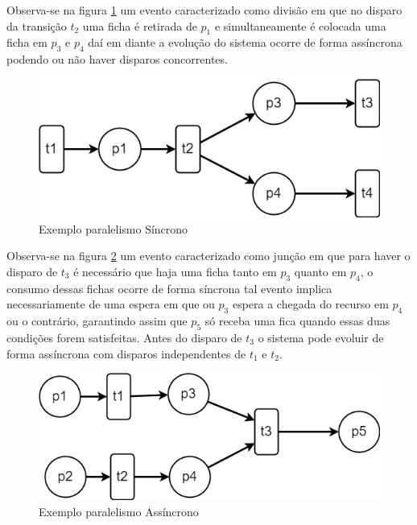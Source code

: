 Observa-se na figura \ref{fig:paralelismo_sincrono} um evento caracterizado como divisão em que no disparo da transição $t_2$ uma ficha é retirada de $p_1$ e simultaneamente é colocada uma ficha em $p_3$ e $p_4$ daí em diante a evolução do sistema ocorre de forma assíncrona podendo ou não haver disparos concorrentes.  

\begin{figure}[h]
    \centering
    \includegraphics[scale=0.4]{figures/Petri/paralelismo_sincrono.jpg}
    \caption{Exemplo paralelismo Síncrono} 
    \label{fig:paralelismo_sincrono}
\end{figure}

Observa-se na figura \ref{fig:paralelismo_assincrono} um evento caracterizado como junção em que para haver o disparo de $t_3$ é necessário que haja uma ficha tanto em $p_3$ quanto em $p_4$, o consumo dessas fichas ocorre de forma síncrona tal evento implica necessariamente de uma espera em que ou $p_3$ espera a chegada do recurso em $p_4$ ou o contrário, garantindo assim que $p_5$ só receba uma fica quando essas duas condições forem satisfeitas. Antes do disparo de $t_3$ o sistema pode evoluir de forma assíncrona com disparos independentes de $t_1$ e $t_2$.

\begin{figure}[h]
    \centering
    \includegraphics[scale=0.4]{figures/Petri/paralelismo_assincrono.png}
    \caption{Exemplo paralelismo Assíncrono}
    \label{fig:paralelismo_assincrono}
\end{figure}

